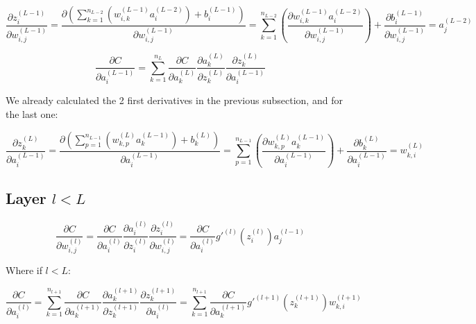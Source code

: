 \documentclass[11pt,a4paper]{report}
\begin{document}
\begin{equation*}
    \frac{\partial z_i^{(L-1)}}{\partial w_{i,j}^{(L-1)}} = \frac{\partial \left( \sum\limits_{k=1}^{n_{L-2}} \left(w_{i,k}^{(L-1)} a_i^{(L-2)}\right) + b_i^{(L-1)}\right)}{\partial w_{i,j}^{(L-1)}} = \sum\limits_{k=1}^{n_{L-2}}\left( \frac{\partial w_{i,k}^{(L-1)} a_i^{(L-2)}}{\partial w_{i,j}^{(L-1)}}\right) + \frac{\partial b_i^{(L-1)}}{\partial w_{i,j}^{(L-1)}} = a_j^{(L-2)}
\end{equation*}



\begin{equation*}
    \frac{\partial C}{\partial a_i^{(L-1)}} = \sum\limits_{k=1}^{n_{L}}\frac{\partial C}{\partial a_k^{(L)}} \frac{\partial a_k^{(L)}}{\partial z_k^{(L)}} \frac{\partial z_k^{(L)}}{\partial a_i^{(L-1)}}
\end{equation*}

We already calculated the 2 first derivatives in the previous subsection, and for the last one:

\begin{equation*}
    \frac{\partial z_k^{(L)}}{\partial a_i^{(L-1)}} = \frac{\partial \left( \sum\limits_{p=1}^{n_{L-1}} \left(w_{k,p}^{(L)} a_k^{(L-1)}\right) + b_k^{(L)}\right)}{\partial a_i^{(L-1)}} = \sum\limits_{p=1}^{n_{L-1}}\left( \frac{\partial w_{k,p}^{(L)} a_k^{(L-1)}}{\partial a_i^{(L-1)}}\right) + \frac{\partial b_k^{(L)}}{\partial a_i^{(L-1)}} = w_{k,i}^{(L)}
\end{equation*}

\subsection{Layer $l<L$}

\begin{equation*}
    \frac{\partial C}{\partial w_{i,j}^{(l)}} = \frac{\partial C}{\partial a_i^{(l)}} \frac{\partial a_i^{(l)}}{\partial z_i^{(l)}} \frac{\partial z_i^{(l)}}{\partial w_{i,j}^{(l)}} = \frac{\partial C}{\partial a_i^{(l)}} g'^{(l)}(z_i^{(l)}) a_j^{(l-1)}
\end{equation*}

Where if $l<L$:

\begin{equation*}
    \frac{\partial C}{\partial a_i^{(l)}} = \sum\limits_{k=1}^{n_{l+1}}\frac{\partial C}{\partial a_k^{(l+1)}} \frac{\partial a_k^{(l+1)}}{\partial z_k^{(l+1)}} \frac{\partial z_k^{(l+1)}}{\partial a_i^{(l)}} = \sum\limits_{k=1}^{n_{l+1}}\frac{\partial C}{\partial a_k^{(l+1)}}g'^{(l+1)}(z_k^{(l+1)}) w_{k,i}^{(l+1)}
\end{equation*}
\end{document}
